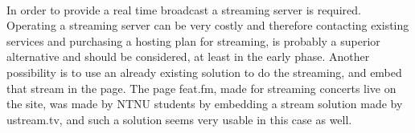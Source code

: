 \paragraph{} In order to provide a real time broadcast a streaming server is required. Operating a streaming server can be very costly and therefore contacting existing services and purchasing a hosting plan for streaming, is probably a superior alternative and should be considered, at least in the early phase. Another possibility is to use an already existing solution to do the streaming, and embed that stream in the page. The page feat.fm, made for streaming concerts live on the site, was made by NTNU students by embedding a stream solution made by ustream.tv, and such a solution seems very usable in this case as well. %

